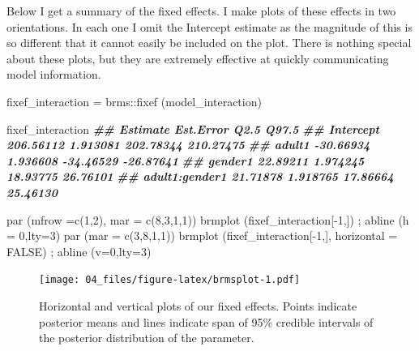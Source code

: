 \documentclass[
]{book}
\newenvironment{Shaded}{\begin{snugshade}}{\end{snugshade}}
\newcommand{\AttributeTok}[1]{\textcolor[rgb]{0.77,0.63,0.00}{#1}}
\newcommand{\ConstantTok}[1]{\textcolor[rgb]{0.00,0.00,0.00}{#1}}
\newcommand{\DecValTok}[1]{\textcolor[rgb]{0.00,0.00,0.81}{#1}}
\newcommand{\DocumentationTok}[1]{\textcolor[rgb]{0.56,0.35,0.01}{\textbf{\textit{#1}}}}
\newcommand{\FunctionTok}[1]{\textcolor[rgb]{0.00,0.00,0.00}{#1}}
\newcommand{\NormalTok}[1]{#1}
\newcommand{\OtherTok}[1]{\textcolor[rgb]{0.56,0.35,0.01}{#1}}
\newcommand{\SpecialCharTok}[1]{\textcolor[rgb]{0.00,0.00,0.00}{#1}}
\begin{document}
Below I get a summary of the fixed effects. I make plots of these effects in two orientations. In each one I omit the Intercept estimate as the magnitude of this is so different that it cannot easily be included on the plot. There is nothing special about these plots, but they are extremely effective at quickly communicating model information.

\begin{Shaded}
\begin{Highlighting}[]
\NormalTok{fixef\_interaction }\OtherTok{=}\NormalTok{ brms}\SpecialCharTok{::}\FunctionTok{fixef}\NormalTok{ (model\_interaction)}

\NormalTok{fixef\_interaction}
\DocumentationTok{\#\#                 Estimate Est.Error      Q2.5     Q97.5}
\DocumentationTok{\#\# Intercept      206.56112  1.913081 202.78344 210.27475}
\DocumentationTok{\#\# adult1         {-}30.66934  1.936608 {-}34.46529 {-}26.87641}
\DocumentationTok{\#\# gender1         22.89211  1.974245  18.93775  26.76101}
\DocumentationTok{\#\# adult1:gender1  21.71878  1.918765  17.86664  25.46130}
\end{Highlighting}
\end{Shaded}

\begin{Shaded}
\begin{Highlighting}[]
\FunctionTok{par}\NormalTok{ (}\AttributeTok{mfrow =}\FunctionTok{c}\NormalTok{(}\DecValTok{1}\NormalTok{,}\DecValTok{2}\NormalTok{), }\AttributeTok{mar =} \FunctionTok{c}\NormalTok{(}\DecValTok{8}\NormalTok{,}\DecValTok{3}\NormalTok{,}\DecValTok{1}\NormalTok{,}\DecValTok{1}\NormalTok{))}
\FunctionTok{brmplot}\NormalTok{ (fixef\_interaction[}\SpecialCharTok{{-}}\DecValTok{1}\NormalTok{,]) ; }\FunctionTok{abline}\NormalTok{ (}\AttributeTok{h =} \DecValTok{0}\NormalTok{,}\AttributeTok{lty=}\DecValTok{3}\NormalTok{)}
\FunctionTok{par}\NormalTok{ (}\AttributeTok{mar =} \FunctionTok{c}\NormalTok{(}\DecValTok{3}\NormalTok{,}\DecValTok{8}\NormalTok{,}\DecValTok{1}\NormalTok{,}\DecValTok{1}\NormalTok{))}
\FunctionTok{brmplot}\NormalTok{ (fixef\_interaction[}\SpecialCharTok{{-}}\DecValTok{1}\NormalTok{,], }\AttributeTok{horizontal =} \ConstantTok{FALSE}\NormalTok{) ; }\FunctionTok{abline}\NormalTok{ (}\AttributeTok{v=}\DecValTok{0}\NormalTok{,}\AttributeTok{lty=}\DecValTok{3}\NormalTok{)}
\end{Highlighting}
\end{Shaded}

\begin{figure}
\centering
\texttt{[image: 04\_files/figure-latex/brmsplot-1.pdf]}
\caption{\label{fig:brmsplot}Horizontal and vertical plots of our fixed effects. Points indicate posterior means and lines indicate span of 95\% credible intervals of the posterior distribution of the parameter.}
\end{figure}
\end{document}
